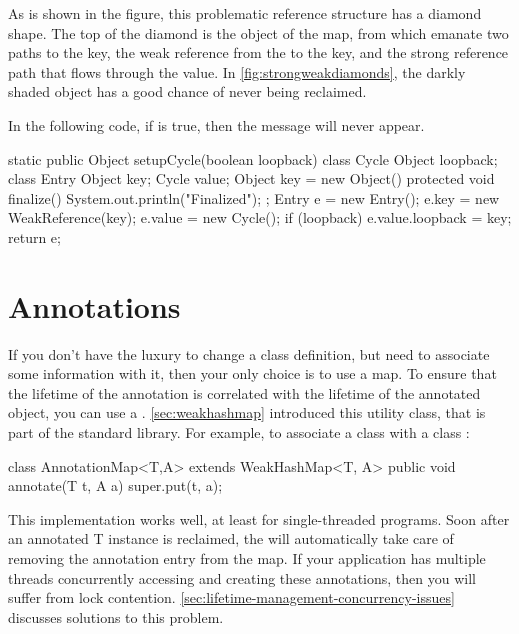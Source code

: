 As is shown in the figure, this problematic reference structure has a diamond
shape. The top of the diamond is the  object of the map, from which
emanate two paths to the key, the weak reference from the  to the
key, and the strong reference path that flows through the value. In
\autoref{fig:strongweakdiamonds}, the darkly shaded object has a good chance of
never being reclaimed. 

In the following code, if  is true, then the 
message will never appear.
\begin{shortlisting}
static public Object setupCycle(boolean loopback) {
   class Cycle {
       Object loopback;
   }
   class Entry {
       Object key;
       Cycle value;
   }
   Object key = new Object() {
           protected void finalize() {
               System.out.println("Finalized");
           }
       };
   Entry e = new Entry();
   e.key = new WeakReference(key);
   e.value = new Cycle();
   if (loopback) e.value.loopback = key;
   return e;
}
\end{shortlisting}

\section{Annotations}

If you don't have the luxury to change a class definition, but need to associate
some information with it, then your only choice is to use a map. To ensure that
the lifetime of the annotation is correlated with the lifetime of the annotated
object, you can use a . \autoref{sec:weakhashmap} introduced
this utility class, that is part of the standard library. For example, to
associate a class  with a class :

\begin{shortlisting}
class AnnotationMap<T,A> extends WeakHashMap<T, A> {
   public void annotate(T t, A a) {
      super.put(t, a);
   }
}
\end{shortlisting}

This implementation works well, at least for single-threaded programs. Soon after
an annotated T instance is reclaimed, the  will automatically
take care of removing the annotation entry from the map. If your application has
multiple threads concurrently accessing and creating these annotations, then you
will suffer from lock contention.
\autoref{sec:lifetime-management-concurrency-issues} discusses solutions to this
problem.

